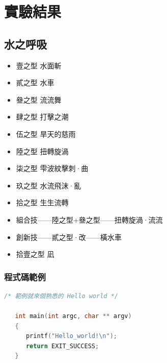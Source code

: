 \chapter{實驗結果}\label{result}

\section{水之呼吸}
\begin{itemize}
\item 壹之型 水面斬
\item 貳之型 水車
\item 叄之型 流流舞
\item 肆之型 打擊之潮
\item 伍之型 旱天的慈雨
\item 陸之型 扭轉旋渦
\item 柒之型 雫波紋擊刺·曲
\item 玖之型 水流飛沫·亂
\item 拾之型 生生流轉
\item 組合技——陸之型+叄之型——扭轉旋渦·流流
\item 創新技——貳之型·改——橫水車
\item 拾壹之型 凪
\end{itemize}

\clearpage

\subsection{程式碼範例}

\begin{lstlisting}[language=C]
   /* 範例就來個熟悉的 Hello world */

   int main(int argc, char ** argv) 
   { 
      printf("Hello_world!\n");
      return EXIT_SUCCESS; 
   }
\end{lstlisting}


